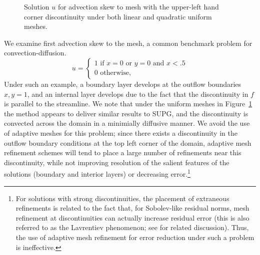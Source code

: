 \documentclass[final,leqno]{siamltex}
\begin{document}
\begin{figure}[!h]
\centering
{}
\caption{Solution $u$ for advection skew to mesh with the upper-left hand corner discontinuity under both linear and quadratic uniform meshes.}
\label{fig:skewUnif}
\end{figure}
We examine first advection skew to the mesh, a common benchmark problem for convection-diffusion.  
\[
u = \begin{cases}
1 \text{ if } x = 0 \text{ or } y = 0 \text{ and } x< .5\\
0 \text{ otherwise},
\end{cases}
\]
Under such an example, a boundary layer develops at the outflow boundaries $x,y = 1$, and an internal layer develops due to the fact that the discontinuity in $f$ is parallel to the streamline.  We note that under the uniform meshes in Figure~\ref{fig:skewUnif} the method appears to deliver similar results to SUPG, and the discontinuity is convected across the domain in a minimially diffusive manner.  We avoid the use of adaptive meshes for this problem; since there exists a discontinuity in the outflow boundary conditions at the top left corner of the domain, adaptive mesh refinement schemes will tend to place a large number of refinements near this discontinuity, while not improving resolution of the salient features of the solutions (boundary and interior layers) or decreasing error.\footnote{For solutions with strong discontinuities, the placement of extraneous refinements is related to the fact that, for Sobolev-like residual norms, mesh refinement at discontinuities can actually increase residual error (this is also referred to as the Lavrentiev phenomenon; see \cite{gerritsmaEuler} for related discussion).  Thus, the use of adaptive mesh refinement for error reduction under such a problem is ineffective. }
\end{document}
